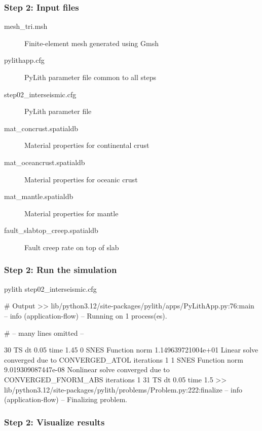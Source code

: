 \documentclass[aspectratio=169]{beamer}
\begin{document}
\begin{frame}
  \frametitle{Step 2: Input files}
  \summary{}

  \begin{description}
  \item[mesh\_tri.msh] Finite-element mesh generated using Gmsh
  \item[pylithapp.cfg] PyLith parameter file common to all steps
  \item[step02\_interseismic.cfg] PyLith parameter file
  \item[mat\_concrust.spatialdb] Material properties for continental crust
  \item[mat\_oceancrust.spatialdb] Material properties for oceanic crust
  \item[mat\_mantle.spatialdb] Material properties for mantle
  \item[fault\_slabtop\_creep.spatialdb] Fault creep rate on top of slab
  \end{description}
    
\end{frame}


\begin{frame}[fragile]
  \frametitle{Step 2: Run the simulation}
  \summary{}

\begin{pyrejournal}
pylith step02_interseismic.cfg

# Output
 >> lib/python3.12/site-packages/pylith/apps/PyLithApp.py:76:main
 -- info (application-flow)
 -- Running on 1 process(es).

# -- many lines omitted --

30 TS dt 0.05 time 1.45
    0 SNES Function norm 1.149639721004e+01
      Linear solve converged due to CONVERGED_ATOL iterations 1
    1 SNES Function norm 9.019309087447e-08
    Nonlinear solve converged due to CONVERGED_FNORM_ABS iterations 1
31 TS dt 0.05 time 1.5
 >> lib/python3.12/site-packages/pylith/problems/Problem.py:222:finalize
 -- info (application-flow)
 -- Finalizing problem.
\end{pyrejournal}
  
\end{frame}


\begin{frame}
  \frametitle{Step 2: Visualize results}

    
\end{frame}
\end{document}
